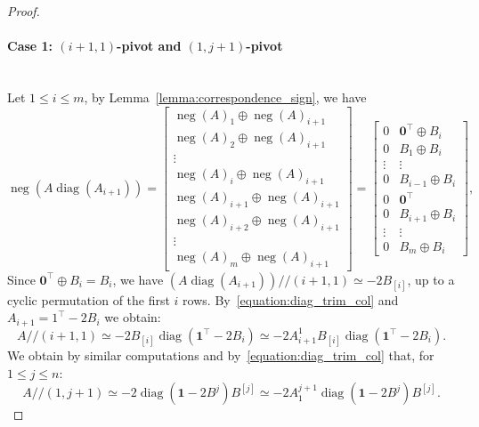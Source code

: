 \documentclass[10pt,a4paper]{amsart}
\DeclareMathOperator{\diag}{diag}
\renewcommand*{\leq}{\leqslant}
\DeclareMathOperator{\nega}{neg}
\newcommand{\trim}{/\!\!/}
\begin{document}
\begin{proof}
\paragraph*{\textbf{Case 1: $(i+1,1)$-pivot and $(1,j+1)$-pivot}}~\\
Let  $1\leq i\leq m$, by Lemma~\ref{lemma:correspondence_sign}, we have
$$\nega{(A\diag(A_{i+1}))} =\begin{bmatrix}
\nega{(A)}_1 \oplus \nega{(A)}_{i+1}\\
\nega{(A)}_2 \oplus \nega{(A)}_{i+1}\\
\vdots \\
\nega{(A)}_{i} \oplus \nega{(A)}_{i+1}\\
\nega{(A)}_{i+1} \oplus \nega{(A)}_{i+1}\\
\nega{(A)}_{i+2} \oplus \nega{(A)}_{i+1}\\
\vdots \\
\nega{(A)}_m \oplus \nega{(A)}_{i+1}
\end{bmatrix} = \begin{bmatrix}
0&\mathbf{0}^\top \oplus B_i\\
0& B_1 \oplus B_i\\
\vdots & \vdots \\
0& B_{i-1}\oplus B_i\\
0& \mathbf{0}^\top\\
0& B_{i+1} \oplus B_i\\
\vdots & \vdots \\
0 & B_m \oplus B_i
\end{bmatrix},$$
Since $\mathbf{0}^\top \oplus B_i=B_i$, we have $(A\diag(A_{i+1}))\trim (i+1,1) \simeq -2B_{[i]}$, up to a cyclic permutation of the first $i$ rows. By~\eqref{equation:diag_trim_col} and $A_{i+1} = 1^\top -2B_i$ we obtain: $$A\trim(i+1,1)\simeq-2B_{[i]}\diag(\mathbf{1}^\top-2B_i)\simeq-2 A_{i+1}^1 B_{[i]}\diag(\mathbf{1}^\top-2B_i).$$
We obtain by similar computations and by~\eqref{equation:diag_trim_col} that, for $1\leq j\leq n$: $$A\trim(1,j+1)\simeq-2\diag(\mathbf{1}-2B^j)B^{[j]}\simeq-2A_1^{j+1}\diag(\mathbf{1}-2B^j)B^{[j]}.$$
\medskip


\end{proof}
\end{document}
